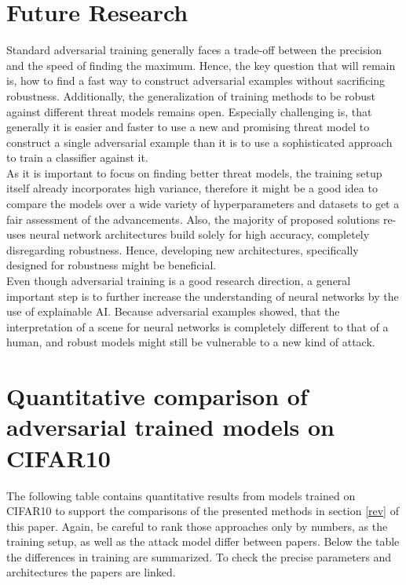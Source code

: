 \documentclass{article}
\begin{document}
\section{Future Research}
Standard adversarial training generally faces a trade-off between the precision and the speed of finding the maximum. Hence, the key question that will remain is, how to find a fast way to construct adversarial examples without sacrificing robustness. Additionally, the generalization of training methods to be robust against different threat models remains open. Especially challenging is, that generally it is easier and faster to use a new and promising threat model to construct a single adversarial example than it is to use a sophisticated approach to train a classifier against it. \\
As it is important to focus on finding better threat models, the training setup itself already incorporates high variance, therefore it might be a good idea to compare the models over a wide variety of hyperparameters and datasets to get a fair assessment of the advancements. Also, the majority of proposed solutions re-uses neural network architectures build solely for high accuracy, completely disregarding robustness. Hence, developing new architectures, specifically designed for robustness might be beneficial. \\
Even though adversarial training is a good research direction, a general important step is to further increase the understanding of neural networks by the use of explainable AI. Because adversarial examples showed, that the interpretation of a scene for neural networks is completely different to that of a human, and robust models might still be vulnerable to a new kind of attack.

\newpage

\appendix
\section{Quantitative comparison of adversarial trained models on CIFAR10}
The following table contains quantitative results from models trained on CIFAR10 to support the comparisons of the presented methods in section \ref{rev} of this paper. Again, be careful to rank those approaches only by numbers, as the training setup, as well as the attack model differ between papers. Below the table the differences in training are summarized. To check the precise parameters and architectures the papers are linked.
\vspace*{-0.2cm}
\end{document}
